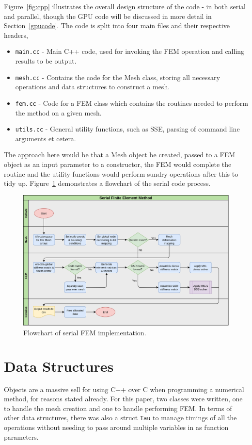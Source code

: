 Figure~\ref{fig:cpp} illustrates the overall design structure of the code - in both serial and parallel, though the GPU code will be discussed in more detail in Section~\ref{gpucode}. The code is split into four main files and their respective headers,
\begin{itemize}
	\item \texttt{main.cc} - Main C++ code, used for invoking the FEM operation and calling results to be output.
	\item \texttt{mesh.cc} - Contains the code for the Mesh class, storing all necessary operations and data structures to construct a mesh.
	\item \texttt{fem.cc} - Code for a FEM class which contains the routines needed to perform the method on a given mesh.
	\item \texttt{utils.cc} - General utility functions, such as SSE, parsing of command line arguments et cetera.
\end{itemize}
The approach here would be that a Mesh object be created, passed to a FEM object as an input parameter to a constructor, the FEM would complete the routine and the utility functions would perform sundry operations after this to tidy up. Figure~\ref{fig:serial_flow} demonstrates a flowchart of the serial code process.
\begin{figure}
	\centering
	\includegraphics[width = 0.9\linewidth]{Figures/serial_flowchart}
	\caption{Flowchart of serial FEM implementation.}
	\label{fig:serial_flow}
\end{figure}

\section{Data Structures}

Objects are a massive sell for using C++ over C when programming a numerical method, for reasons stated already. For this paper, two classes were written, one to handle the mesh creation and one to handle performing FEM. In terms of other data structures, there was also a struct \texttt{Tau} to manage timings of all the operations without needing to pass around multiple variables in as function parameters.

